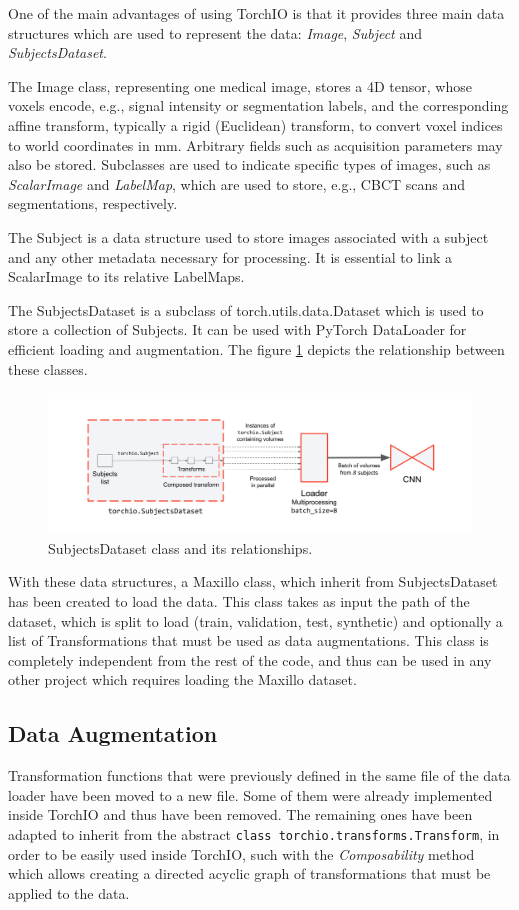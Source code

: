 One of the main advantages of using TorchIO is that it provides three main
data structures which are used to represent the data: \emph{Image},
\emph{Subject} and \emph{SubjectsDataset}.

The Image class, representing one medical image, stores a 4D tensor, whose
voxels encode, e.g., signal intensity or segmentation labels, and the
corresponding affine transform, typically a rigid (Euclidean) transform, to
convert voxel indices to world coordinates in mm. Arbitrary fields such as
acquisition parameters may also be stored. Subclasses are used to indicate
specific types of images, such as \emph{ScalarImage} and \emph{LabelMap}, which
are used to store, e.g., CBCT scans and segmentations, respectively.

The Subject is a data structure used to store images associated with a subject
and any other metadata necessary for processing. It is essential to link a
ScalarImage to its relative LabelMaps.

The SubjectsDataset is a subclass of torch.utils.data.Dataset which is used to
store a collection of Subjects. It can be used with PyTorch DataLoader for
efficient loading and augmentation. The figure \ref{fig:subjectsdataset}
depicts the relationship between these classes.
\begin{figure}[h]
  \centering
  \includegraphics[width=0.9\linewidth]{Images/subjectsdataset.png}
  \caption{SubjectsDataset class and its relationships.}
  \label{fig:subjectsdataset}
\end{figure}
With these data structures, a Maxillo class, which inherit from
SubjectsDataset has been created to load the data. This class takes as input the
path of the dataset, which is split to load (train, validation, test, synthetic)
and optionally a list of Transformations that must be used as data augmentations. This class is completely independent from the rest of the code, and thus can be used in any other project which requires loading the Maxillo dataset.

\subsection{Data Augmentation}
Transformation functions that were previously defined in the same file of the data loader have been moved to a new file. Some of them were already implemented inside TorchIO and thus have been removed. The remaining ones have been adapted to inherit from the abstract \texttt{class torchio.transforms.Transform}, in
order to be easily used inside TorchIO, such with the \emph{Composability} method
which allows creating a directed acyclic graph of transformations that must be
applied to the data.

